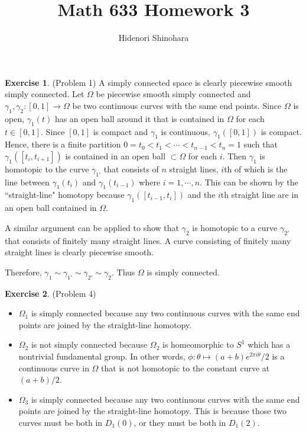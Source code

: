 \documentclass[12pt, psamsfonts]{amsart}
\theoremstyle{definition}
\newtheorem*{exer}{Exercise}
\theoremstyle{remark}
\numberwithin{equation}{section}
\begin{document}
\title{Math 633 Homework 3}
\author{Hidenori Shinohara}
\maketitle

\begin{exer}{(Problem 1)}
  A simply connected space is clearly piecewise smooth simply connected.
  Let $\Omega$ be piecewise smooth simply connected and $\gamma_1, \gamma_2: [0, 1] \rightarrow \Omega$ be two continuous curves with the same end points.
  Since $\Omega$ is open, $\gamma_1(t)$ has an open ball around it that is contained in $\Omega$ for each $t \in [0, 1]$.
  Since $[0, 1]$ is compact and $\gamma_1$ is continuous, $\gamma_1([0, 1])$ is compact.
  Hence, there is a finite partition $0 = t_0 < t_1 < \cdots < t_{n - 1} < t_n = 1$ such that $\gamma_1([t_i, t_{i + 1}])$ is contained in an open ball $\subset \Omega$ for each $i$.
  Then $\gamma_1$ is homotopic to the curve $\gamma_{1'}$ that consists of $n$ straight lines, $i$th of which is the line between $\gamma_1(t_i)$ and $\gamma_1(t_{i - 1})$ where $i = 1, \cdots, n$.
  This can be shown by the ``straight-line" homotopy because $\gamma_1([t_{i - 1}, t_{i}])$ and the $i$th straight line are in an open ball contained in $\Omega$.

  A similar argument can be applied to show that $\gamma_2$ is homotopic to a curve $\gamma_{2'}$ that consists of finitely many straight lines.
  A curve consisting of finitely many straight lines is clearly piecewise smooth.

  Therefore, $\gamma_1 \sim \gamma_{1'} \sim \gamma_{2'} \sim \gamma_2$.
  Thus $\Omega$ is simply connected.
\end{exer}

\begin{exer}{(Problem 4)}
  \begin{itemize}
    \item
      $\Omega_1$ is simply connected because any two continuous curves with the same end points are joined by the straight-line homotopy.
    \item
      $\Omega_2$ is not simply connected because $\Omega_2$ is homeomorphic to $S^1$ which has a nontrivial fundamental group.
      In other words, $\phi: \theta \mapsto (a + b)e^{2\pi i\theta}/2$ is a continuous curve in $\Omega$ that is not homotopic to the constant curve at $(a + b) / 2$.
    \item
      $\Omega_3$ is simply connected because any two continuous curves with the same end points are joined by the straight-line homotopy.
      This is because those two curves must be both in $D_1(0)$, or they must be both in $D_1(2)$.
  \end{itemize}
\end{exer}
\end{document}
